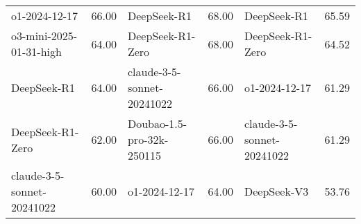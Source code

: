 {\begin{longtable}{p{4.2cm}>{\centering\arraybackslash} p{0.8cm}|p{4.2cm} >{\centering\arraybackslash} p{0.8cm}|p{4.2cm} >{\centering\arraybackslash} p{0.8cm}}
\hline
\cellcolor{blue!5} o1-2024-12-17 & \cellcolor{blue!2}66.00 & \cellcolor{yellow!5} DeepSeek-R1 & \cellcolor{yellow!2} 68.00 & \cellcolor{olive!5} DeepSeek-R1 & \cellcolor{olive!2} 65.59\\
\cellcolor{blue!5} o3-mini-2025-01-31-high & \cellcolor{blue!2}64.00 & \cellcolor{yellow!5} DeepSeek-R1-Zero & \cellcolor{yellow!2} 68.00 & \cellcolor{olive!5} DeepSeek-R1-Zero & \cellcolor{olive!2} 64.52\\
\cellcolor{blue!5} DeepSeek-R1 & \cellcolor{blue!2}64.00 & \cellcolor{yellow!5} claude-3-5-sonnet-20241022 & \cellcolor{yellow!2} 66.00 & \cellcolor{olive!5} o1-2024-12-17 & \cellcolor{olive!2} 61.29\\
\cellcolor{blue!5} DeepSeek-R1-Zero & \cellcolor{blue!2}62.00 & \cellcolor{yellow!5} Doubao-1.5-pro-32k-250115 & \cellcolor{yellow!2} 66.00 & \cellcolor{olive!5} claude-3-5-sonnet-20241022 & \cellcolor{olive!2} 61.29\\
\cellcolor{blue!5} claude-3-5-sonnet-20241022 & \cellcolor{blue!2}60.00 & \cellcolor{yellow!5} o1-2024-12-17 & \cellcolor{yellow!2} 64.00 & \cellcolor{olive!5} DeepSeek-V3 & \cellcolor{olive!2} 53.76\\
\hline

\end{longtable}
}
